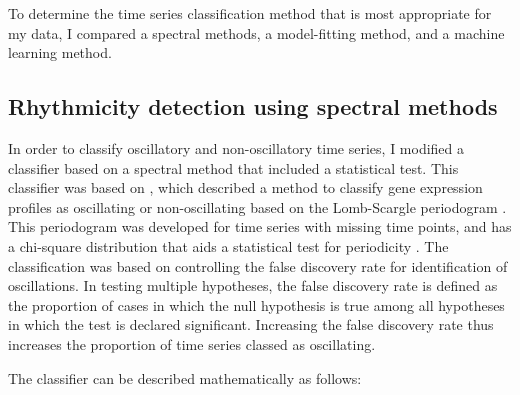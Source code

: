To determine the time series classification method that is most appropriate for my data, I compared a  spectral methods, a model-fitting method, and a machine learning method.


\subsection{Rhythmicity detection using spectral methods}
\label{subsec:analysis-classification-spectral}

In order to classify oscillatory and non-oscillatory time series, I modified a classifier based on a spectral method that included a statistical test.
This classifier was based on \textcite{glynnDetectingPeriodicPatterns2006a}, which described a method to classify gene expression profiles as oscillating or non-oscillating based on the Lomb-Scargle periodogram \parencite{lombLeastsquaresFrequencyAnalysis1976}.
This periodogram was developed for time series with missing time points, and has a chi-square distribution that aids a statistical test for periodicity \parencite{scargleStudiesAstronomicalTime1982}.
The classification was based on controlling the false discovery rate for identification of oscillations.
In testing multiple hypotheses, the false discovery rate is defined as the proportion of cases in which the null hypothesis is true among all hypotheses in which the test is declared significant.
Increasing the false discovery rate thus increases the proportion of time series classed as oscillating.

The classifier can be described mathematically as follows:

